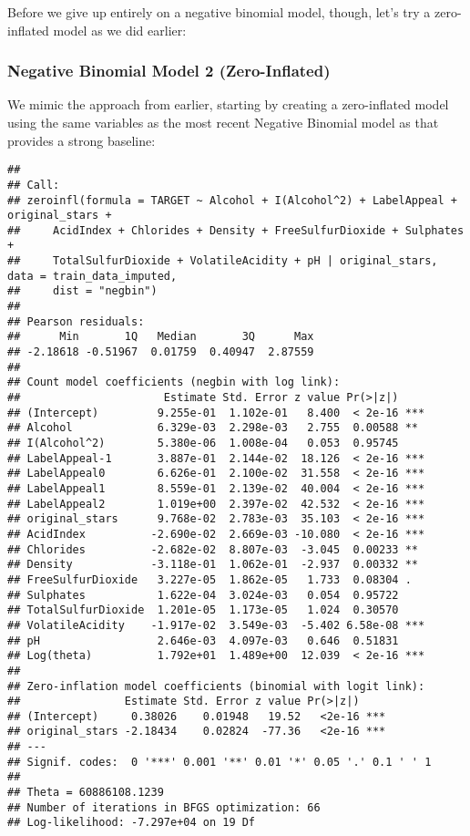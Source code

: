 \documentclass[
]{article}
\begin{document}
Before we give up entirely on a negative binomial model, though, let's
try a zero-inflated model as we did earlier:

\subsubsection{Negative Binomial Model 2
(Zero-Inflated)}\label{negative-binomial-model-2-zero-inflated}

We mimic the approach from earlier, starting by creating a zero-inflated
model using the same variables as the most recent Negative Binomial
model as that provides a strong baseline:

\begin{verbatim}
## 
## Call:
## zeroinfl(formula = TARGET ~ Alcohol + I(Alcohol^2) + LabelAppeal + original_stars + 
##     AcidIndex + Chlorides + Density + FreeSulfurDioxide + Sulphates + 
##     TotalSulfurDioxide + VolatileAcidity + pH | original_stars, data = train_data_imputed, 
##     dist = "negbin")
## 
## Pearson residuals:
##      Min       1Q   Median       3Q      Max 
## -2.18618 -0.51967  0.01759  0.40947  2.87559 
## 
## Count model coefficients (negbin with log link):
##                      Estimate Std. Error z value Pr(>|z|)    
## (Intercept)         9.255e-01  1.102e-01   8.400  < 2e-16 ***
## Alcohol             6.329e-03  2.298e-03   2.755  0.00588 ** 
## I(Alcohol^2)        5.380e-06  1.008e-04   0.053  0.95745    
## LabelAppeal-1       3.887e-01  2.144e-02  18.126  < 2e-16 ***
## LabelAppeal0        6.626e-01  2.100e-02  31.558  < 2e-16 ***
## LabelAppeal1        8.559e-01  2.139e-02  40.004  < 2e-16 ***
## LabelAppeal2        1.019e+00  2.397e-02  42.532  < 2e-16 ***
## original_stars      9.768e-02  2.783e-03  35.103  < 2e-16 ***
## AcidIndex          -2.690e-02  2.669e-03 -10.080  < 2e-16 ***
## Chlorides          -2.682e-02  8.807e-03  -3.045  0.00233 ** 
## Density            -3.118e-01  1.062e-01  -2.937  0.00332 ** 
## FreeSulfurDioxide   3.227e-05  1.862e-05   1.733  0.08304 .  
## Sulphates           1.622e-04  3.024e-03   0.054  0.95722    
## TotalSulfurDioxide  1.201e-05  1.173e-05   1.024  0.30570    
## VolatileAcidity    -1.917e-02  3.549e-03  -5.402 6.58e-08 ***
## pH                  2.646e-03  4.097e-03   0.646  0.51831    
## Log(theta)          1.792e+01  1.489e+00  12.039  < 2e-16 ***
## 
## Zero-inflation model coefficients (binomial with logit link):
##                Estimate Std. Error z value Pr(>|z|)    
## (Intercept)     0.38026    0.01948   19.52   <2e-16 ***
## original_stars -2.18434    0.02824  -77.36   <2e-16 ***
## ---
## Signif. codes:  0 '***' 0.001 '**' 0.01 '*' 0.05 '.' 0.1 ' ' 1 
## 
## Theta = 60886108.1239 
## Number of iterations in BFGS optimization: 66 
## Log-likelihood: -7.297e+04 on 19 Df
\end{verbatim}
\end{document}
